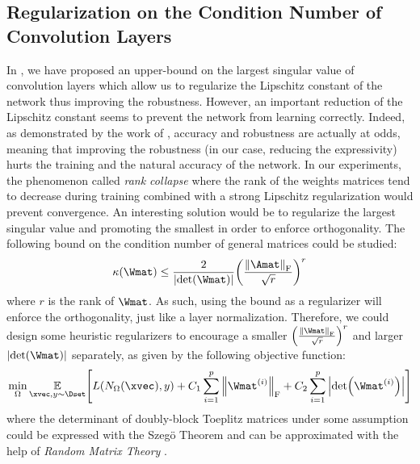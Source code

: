 \subsection{Regularization on the Condition Number of Convolution Layers}


In , we have proposed an upper-bound on the largest singular value of convolution layers which allow us to regularize the Lipschitz constant of the network thus improving the robustness.
However, an important reduction of the Lipschitz constant seems to prevent the network from learning correctly. 
Indeed, as demonstrated by the work of \cite{zhang2019theoretically}, accuracy and robustness are actually at odds, meaning that improving the robustness (\ie in our case, reducing the expressivity) hurts the training and the natural accuracy of the network. 
In our experiments, the phenomenon called \emph{rank collapse} \cite{saxe2014exact} where the rank of the weights matrices tend to decrease during training combined with a strong Lipschitz regularization would prevent convergence.
An interesting solution would be to regularize the largest singular value and promoting the smallest in order to enforce orthogonality.
The following bound on the condition number of general matrices \citet{guggenheimer1995simple} could be studied:
\begin{equation}
  \kappa(\Wmat) \le \frac{2}{\abs{\det(\Wmat)}} \left(\frac{\norm{\Amat}_\fro}{\sqrt{r}}\right)^r
\end{equation}
where $r$ is the rank of $\Wmat$.
As such, using the bound as a regularizer will enforce the orthogonality, just like a layer normalization.
Therefore, we could design some heuristic regularizers to encourage a smaller $\left(\frac{\norm{\Wmat}_\fro}{\sqrt{r}}\right)^r$ and larger $\abs{\det(\Wmat)}$ separately, as given by the following objective function: 
\begin{align} 
  \min_{\Omega} \Ebb_{\xvec, y \sim \Dset} \left[ L(N_\Omega(\xvec), y)  + C_1 \sum_{i=1}^\depth \norm{\Wmat^{(i)}}_\fro + C_2 \sum_{i=1}^{\depth} \abs{\det(\Wmat^{(i)})} \right]
\end{align}
where the determinant of doubly-block Toeplitz matrices under some assumption could be expressed with the Szeg\"{o} Theorem \cite{szego1915grenzwertsatz} and can be approximated with the help of \emph{Random Matrix Theory} \cite{basor2017asymptotics}.

